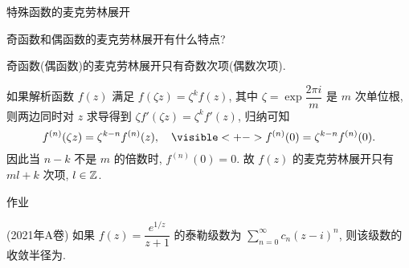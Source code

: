 \begin{frame}{特殊函数的麦克劳林展开}
\begin{thinking}
奇函数和偶函数的麦克劳林展开有什么特点?
\end{thinking}
\begin{answer}
奇函数(偶函数)的麦克劳林展开只有奇数次项(偶数次项).

\onslide<+->
如果解析函数 $f(z)$ 满足 $f(\zeta z)=\zeta^k f(z)$, 其中 $\zeta=\exp\dfrac{2\pi i}m$ 是 $m$ 次单位根,
\onslide<+->
则两边同时对 $z$ 求导得到 $\zeta f'(\zeta z)=\zeta^k f'(z)$,
\onslide<+->
归纳可知
\[f^{(n)}(\zeta z)=\zeta^{k-n}f^{(n)}(z),
\quad\visible<+->{f^{(n)}(0)=\zeta^{k-n}f^{(n)}(0).}\]
\onslide<+->
因此当 $n-k$ 不是 $m$ 的倍数时, $f^{(n)}(0)=0$.
\onslide<+->
故 $f(z)$ 的麦克劳林展开只有 $ml+k$ 次项, $l\in{\mathbb{Z}}$.
\end{answer}
\end{frame}


{
\homework
\begin{frame}[<*>]{作业}
  \begin{homeworks}
    \item(2021年A卷) 如果 $f(z)=\dfrac{e^{1/z}}{z+1}$ 的泰勒级数为 $\displaystyle\sum_{n=0}^\infty c_n(z-i)^n$, 则该级数的收敛半径为\fillblank{}.
  \end{homeworks}
\end{frame}
}
